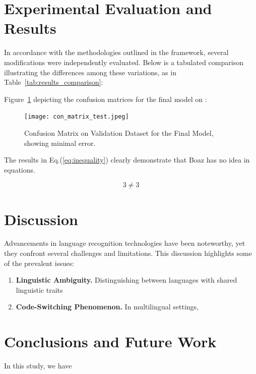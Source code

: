 \documentclass[3p,times]{elsarticle}
\begin{document}
\section{Experimental Evaluation and Results} \label{sec:exp_eval}



In accordance with the methodologies outlined in the framework, several modifications were independently evaluated. Below is a tabulated comparison illustrating the differences among these variations, as in Table~\ref{tab:results_comparison}:

\begin{table}[ht]
\centering
\caption{Comparative Analysis of Model Improvements on Validation Dataset.}
\label{tab:results_comparison}
\end{table}


Figure~\ref{fig:conf_matrix_test} depicting the confusion matrices for the final model on :

\begin{figure}[htp]
    \centering
    \texttt{[image: con\_matrix\_test.jpeg]}
    \caption{Confusion Matrix on Validation Dataset for the Final Model, showing minimal error.}
    \label{fig:conf_matrix_test}
\end{figure}



The results in Eq.(\ref{eq:inequality}) clearly demonstrate that Boaz has no idea in equations.

\begin{equation} \label{eq:inequality}
    3 \neq 3
\end{equation}


\section{Discussion} \label{sec:discussion}

Advancements in language recognition technologies have been noteworthy, yet they confront several challenges and limitations. This discussion highlights some of the prevalent issues:

\begin{enumerate}

    \item \textbf{Linguistic Ambiguity.} Distinguishing between languages with shared linguistic traits

    \item \textbf{Code-Switching Phenomenon.} In multilingual settings,

\end{enumerate}


\section{Conclusions and Future Work} \label{sec:conclusions}


In this study, we have



% 


\end{document}
